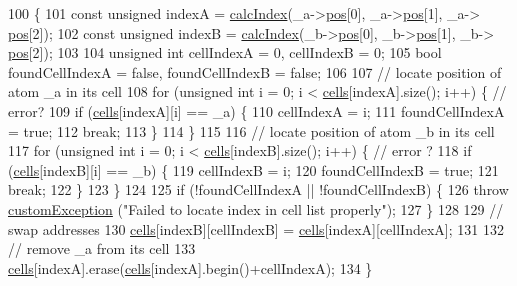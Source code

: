 \begin{DoxyCode}
100                                                         \{
101     \textcolor{keyword}{const} \textcolor{keywordtype}{unsigned} indexA = \hyperlink{classcell_list_aa6b843131cd487164a137571c7343cab}{calcIndex}(\_a->\hyperlink{classatom_a3ae5f4880e7831d8b2c9fda72b4eb24a}{pos}[0], \_a->\hyperlink{classatom_a3ae5f4880e7831d8b2c9fda72b4eb24a}{pos}[1], \_a->
      \hyperlink{classatom_a3ae5f4880e7831d8b2c9fda72b4eb24a}{pos}[2]);
102     \textcolor{keyword}{const} \textcolor{keywordtype}{unsigned} indexB = \hyperlink{classcell_list_aa6b843131cd487164a137571c7343cab}{calcIndex}(\_b->\hyperlink{classatom_a3ae5f4880e7831d8b2c9fda72b4eb24a}{pos}[0], \_b->\hyperlink{classatom_a3ae5f4880e7831d8b2c9fda72b4eb24a}{pos}[1], \_b->
      \hyperlink{classatom_a3ae5f4880e7831d8b2c9fda72b4eb24a}{pos}[2]);
103 
104     \textcolor{keywordtype}{unsigned} \textcolor{keywordtype}{int} cellIndexA = 0, cellIndexB = 0;
105     \textcolor{keywordtype}{bool} foundCellIndexA = \textcolor{keyword}{false}, foundCellIndexB = \textcolor{keyword}{false};
106 
107     \textcolor{comment}{// locate position of atom \_a in its cell}
108     \textcolor{keywordflow}{for} (\textcolor{keywordtype}{unsigned} \textcolor{keywordtype}{int} i = 0; i < \hyperlink{classcell_list_a10bc0c3ae819293b1e88bc7d1bfdb2aa}{cells}[indexA].size(); i++) \{ \textcolor{comment}{// error?}
109         \textcolor{keywordflow}{if} (\hyperlink{classcell_list_a10bc0c3ae819293b1e88bc7d1bfdb2aa}{cells}[indexA][i] == \_a) \{
110             cellIndexA = i;
111             foundCellIndexA = \textcolor{keyword}{true};
112             \textcolor{keywordflow}{break};
113         \}
114     \}
115 
116     \textcolor{comment}{// locate position of atom \_b in its cell}
117     \textcolor{keywordflow}{for} (\textcolor{keywordtype}{unsigned} \textcolor{keywordtype}{int} i = 0; i < \hyperlink{classcell_list_a10bc0c3ae819293b1e88bc7d1bfdb2aa}{cells}[indexB].size(); i++) \{ \textcolor{comment}{// error ?}
118         \textcolor{keywordflow}{if} (\hyperlink{classcell_list_a10bc0c3ae819293b1e88bc7d1bfdb2aa}{cells}[indexB][i] == \_b) \{
119             cellIndexB = i;
120             foundCellIndexB = \textcolor{keyword}{true};
121             \textcolor{keywordflow}{break};
122         \}
123     \}
124 
125     \textcolor{keywordflow}{if} (!foundCellIndexA || !foundCellIndexB) \{
126         \textcolor{keywordflow}{throw} \hyperlink{classcustom_exception}{customException} (\textcolor{stringliteral}{"Failed to locate index in cell list properly"});
127     \}
128 
129     \textcolor{comment}{// swap addresses}
130     \hyperlink{classcell_list_a10bc0c3ae819293b1e88bc7d1bfdb2aa}{cells}[indexB][cellIndexB] = \hyperlink{classcell_list_a10bc0c3ae819293b1e88bc7d1bfdb2aa}{cells}[indexA][cellIndexA];
131 
132     \textcolor{comment}{// remove \_a from its cell}
133     \hyperlink{classcell_list_a10bc0c3ae819293b1e88bc7d1bfdb2aa}{cells}[indexA].erase(\hyperlink{classcell_list_a10bc0c3ae819293b1e88bc7d1bfdb2aa}{cells}[indexA].begin()+cellIndexA);
134 \}
\end{DoxyCode}
